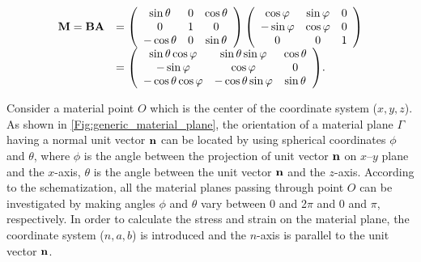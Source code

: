 \begin{eqnarray}
\begin{array}{*{20}{l}}
{{\bf{M}} = {\bf{BA}}}&{ = \left( {\begin{array}{*{20}{c}}
{\sin \theta }&0&{\cos \theta }\\
0&1&0\\
{ - \cos \theta }&0&{\sin \theta }
\end{array}} \right)\left( {\begin{array}{*{20}{c}}
{\cos \varphi }&{\sin \varphi }&0\\
{ - \sin \varphi }&{\cos \varphi }&0\\
0&0&1
\end{array}} \right)}\\
{}&{ = \left( {\begin{array}{*{20}{c}}
{\sin \theta \cos \varphi }&{\sin \theta \sin \varphi }&{\cos \theta }\\
{ - \sin \varphi }&{\cos \varphi }&0\\
{ - \cos \theta \cos \varphi }&{ - \cos \theta \sin \varphi }&{\sin \theta }
\end{array}} \right)}.
\end{array}
\label{Equ:transformation_matrix}
\end{eqnarray}

Consider a material point $O$ which is the center of the coordinate system ($x,y,z$). As shown in \ref{Fig:generic_material_plane}, the orientation of a material plane $\Gamma$ having a normal unit vector ${\bf{n}}$ can be located by using spherical coordinates $\phi$ and $\theta$, where $\phi$ is the angle between the projection of unit vector ${\bf{n}}$ on $x–y$ plane and the $x$-axis, $\theta$ is the angle between the unit vector ${\bf{n}}$ and the $z$-axis. According to the schematization, all the material planes passing through point $O$ can be investigated by making angles $\phi$ and $\theta$ vary between 0 and 2$\pi$ and 0 and $\pi$, respectively. In order to calculate the stress and strain on the material plane, the coordinate system ($n,a,b$) is introduced and the $n$-axis is parallel to the unit vector ${\bf{n}}$.

